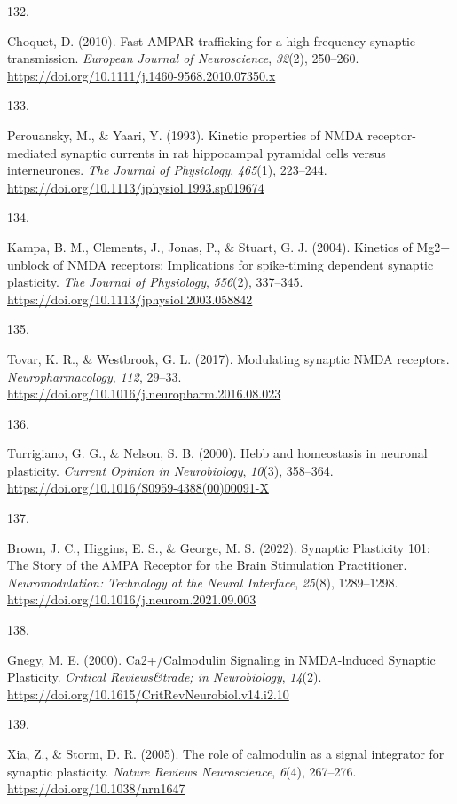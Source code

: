 \documentclass[
  11pt,
  letterpaper,
]{scrreprt}
\newlength{\cslhangindent}
\newlength{\csllabelwidth}
\newenvironment{CSLReferences}[2] %
 {\begin{list}{}{%
  \setlength{\itemindent}{0pt}
  \setlength{\leftmargin}{0pt}
  \setlength{\parsep}{0pt}
  \ifodd #1
   \setlength{\leftmargin}{\cslhangindent}
   \setlength{\itemindent}{-1\cslhangindent}
  \fi
  \setlength{\itemsep}{#2\baselineskip}}}
 {\end{list}}
\newcommand{\CSLLeftMargin}[1]{\parbox[t]{\csllabelwidth}{\strut#1\strut}}
\newcommand{\CSLRightInline}[1]{\parbox[t]{\linewidth - \csllabelwidth}{\strut#1\strut}}
\begin{document}
\begin{CSLReferences}{0}{0}
\CSLLeftMargin{132. }%
\CSLRightInline{Choquet, D. (2010). Fast {AMPAR} trafficking for a
high-frequency synaptic transmission. \emph{European Journal of
Neuroscience}, \emph{32}(2), 250--260.
\url{https://doi.org/10.1111/j.1460-9568.2010.07350.x}}

\CSLLeftMargin{133. }%
\CSLRightInline{Perouansky, M., \& Yaari, Y. (1993). Kinetic properties
of {NMDA} receptor-mediated synaptic currents in rat hippocampal
pyramidal cells versus interneurones. \emph{The Journal of Physiology},
\emph{465}(1), 223--244.
\url{https://doi.org/10.1113/jphysiol.1993.sp019674}}

\CSLLeftMargin{134. }%
\CSLRightInline{Kampa, B. M., Clements, J., Jonas, P., \& Stuart, G. J.
(2004). Kinetics of {Mg2}+ unblock of {NMDA} receptors: Implications for
spike-timing dependent synaptic plasticity. \emph{The Journal of
Physiology}, \emph{556}(2), 337--345.
\url{https://doi.org/10.1113/jphysiol.2003.058842}}

\CSLLeftMargin{135. }%
\CSLRightInline{Tovar, K. R., \& Westbrook, G. L. (2017). Modulating
synaptic {NMDA} receptors. \emph{Neuropharmacology}, \emph{112}, 29--33.
\url{https://doi.org/10.1016/j.neuropharm.2016.08.023}}

\CSLLeftMargin{136. }%
\CSLRightInline{Turrigiano, G. G., \& Nelson, S. B. (2000). Hebb and
homeostasis in neuronal plasticity. \emph{Current Opinion in
Neurobiology}, \emph{10}(3), 358--364.
\url{https://doi.org/10.1016/S0959-4388(00)00091-X}}

\CSLLeftMargin{137. }%
\CSLRightInline{Brown, J. C., Higgins, E. S., \& George, M. S. (2022).
Synaptic {Plasticity} 101: {The Story} of the {AMPA Receptor} for the
{Brain Stimulation Practitioner}. \emph{Neuromodulation: Technology at
the Neural Interface}, \emph{25}(8), 1289--1298.
\url{https://doi.org/10.1016/j.neurom.2021.09.003}}

\CSLLeftMargin{138. }%
\CSLRightInline{Gnegy, M. E. (2000). Ca2+/{Calmodulin Signaling} in
{NMDA-lnduced Synaptic Plasticity}. \emph{Critical Reviews\&trade; in
Neurobiology}, \emph{14}(2).
\url{https://doi.org/10.1615/CritRevNeurobiol.v14.i2.10}}

\CSLLeftMargin{139. }%
\CSLRightInline{Xia, Z., \& Storm, D. R. (2005). The role of calmodulin
as a signal integrator for synaptic plasticity. \emph{Nature Reviews
Neuroscience}, \emph{6}(4), 267--276.
\url{https://doi.org/10.1038/nrn1647}}


\end{CSLReferences}
\end{document}

